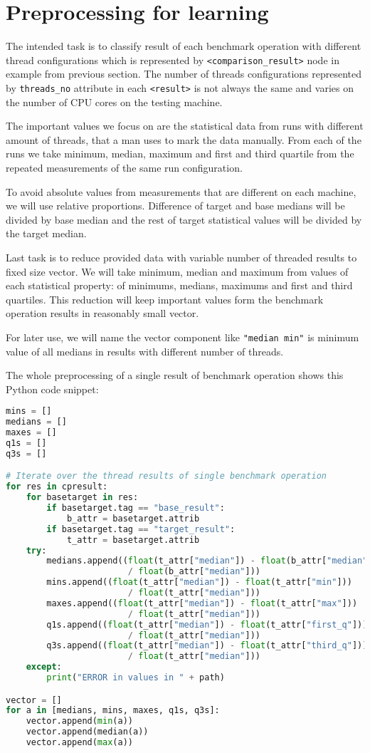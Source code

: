 \section{Preprocessing for learning}
The intended task is to classify result of each benchmark operation with
different thread configurations which is represented by
\texttt{<comparison\_result>} node in example from previous section. The number
of threads configurations represented by \texttt{threads\_no} attribute in each
\texttt{<result>} is not always the same and varies on the number of CPU cores
on the testing machine.

The important values we focus on are the statistical data from runs with
different amount of threads, that a man uses to mark the data manually. From
each of the runs we take minimum, median, maximum and first and third quartile
from the repeated measurements of the same run configuration.

To avoid absolute values from measurements that are different on each machine,
we will use relative proportions. Difference of target and base medians will be
divided by base median and the rest of target statistical values will be divided
by the target median.

Last task is to reduce provided data with variable number of threaded results
to fixed size vector. We will take minimum, median and maximum from values of
each statistical property: of minimums, medians, maximums and first and third
quartiles. This reduction will keep important values form the benchmark
operation results in reasonably small vector.

For later use, we will name the vector component like \texttt{"median min"} is
minimum value of all medians in results with different number of threads.

The whole preprocessing of a single result of benchmark operation shows this
Python code snippet:
\begin{lstlisting}[language=Python]
mins = []
medians = []
maxes = []
q1s = []
q3s = []

# Iterate over the thread results of single benchmark operation
for res in cpresult:
    for basetarget in res:
        if basetarget.tag == "base_result":
            b_attr = basetarget.attrib
        if basetarget.tag == "target_result":
            t_attr = basetarget.attrib
    try:
        medians.append((float(t_attr["median"]) - float(b_attr["median"]))
                        / float(b_attr["median"]))
        mins.append((float(t_attr["median"]) - float(t_attr["min"]))
                        / float(t_attr["median"]))
        maxes.append((float(t_attr["median"]) - float(t_attr["max"]))
                        / float(t_attr["median"]))
        q1s.append((float(t_attr["median"]) - float(t_attr["first_q"]))
                        / float(t_attr["median"]))
        q3s.append((float(t_attr["median"]) - float(t_attr["third_q"]))
                        / float(t_attr["median"]))
    except:
        print("ERROR in values in " + path)

vector = []
for a in [medians, mins, maxes, q1s, q3s]:
    vector.append(min(a))
    vector.append(median(a))
    vector.append(max(a))
\end{lstlisting}

